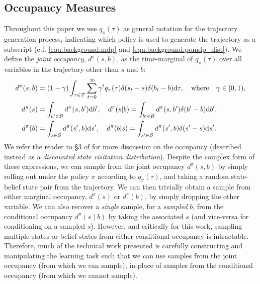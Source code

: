 \subsection{Occupancy Measures}\label{supp:sec:occupancy}
Throughout this paper we use $q_{\pi}(\tau)$ as general notation for the trajectory generation process, indicating which policy is used to generate the trajectory as a subscript (c.f. \eqref{equ:background:mdp} and \eqref{equ:background:pomdp_dist}).  We define the \emph{joint occupancy}, $d^{\pi}(s, b)$, as the time-marginal of $q_{\pi}(\tau)$ over all variables in the trajectory other than $s$ and $b$:
\begin{align}
    d^{\pi}(s,b) &= (1-\gamma) \int_{\tau \in \mathcal{T}} \sum_{t=0}^{\infty} \gamma^t q_{\pi} (\tau) \delta (s_t - s) \delta (b_t - b) \mathrm{d} \tau , \quad \text{where }\ \  \gamma \in [0, 1), \\
    d^{\pi}(s) &= \int_{b' \in \mathcal{B}} d^{\pi}(s, b') \mathrm{d} b',  \quad d^{\pi}(s | b) = \int_{b' \in \mathcal{B}} d^{\pi}(s, b') \delta ( b' - b ) \mathrm{d} b' , \\
    d^{\pi}(b) &= \int_{s \in \mathcal{S}} d^{\pi}(s', b) \mathrm{d} s' , \quad d^{\pi}(b | s) = \int_{s' \in \mathcal{S}} d^{\pi}(s', b) \delta ( s' - s ) \mathrm{d} s'.
\end{align} 
We refer the reader to \S 3 of \citet{pmlr-v125-agarwal20a} for more discussion on the occupancy (described instead as a \emph{discounted state visitation distribution}).  Despite the complex form of these expressions, we can sample from the joint occupancy $d^{\pi}(s, b)$ by simply rolling out under the policy $\pi$ according to $q_{\pi}(\tau)$, and taking a random state-belief state pair from the trajectory.  We can then trivially obtain a sample from either marginal occupancy, $d^{\pi}(s)$ or $d^{\pi}(b)$, by simply dropping the other variable.  We can also recover a \emph{single} sample, for a \emph{sampled} $b$, from the conditional occupancy $d^{\pi}(s \mid b)$ by taking the associated $s$ (and vice-versa for conditioning on a sampled $s$).  However, and critically for this work, sampling multiple states or belief states from either conditional occupancy is intractable.  Therefore, much of the technical work presented is carefully constructing and manipulating the learning task such that we can use samples from the joint occupancy (from which we can sample), in-place of samples from the conditional occupancy (from which we cannot sample). 






\newpage

